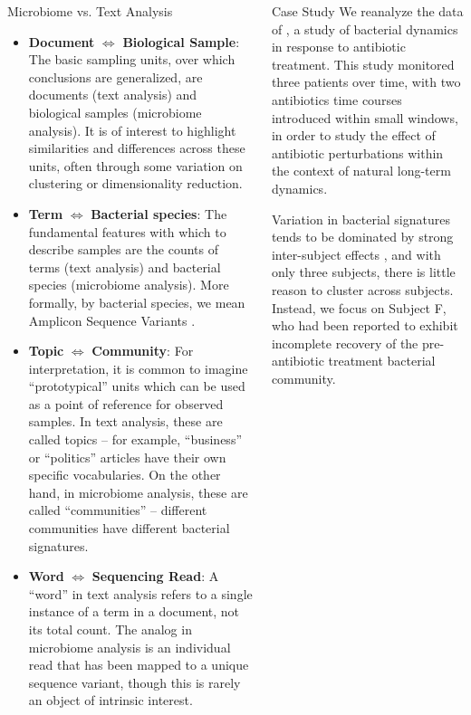 \documentclass[final, 8pt]{beamer}
\newlength{\onecolwid}
\begin{document}
\begin{frame}
\begin{columns}
\begin{column}{\onecolwid}
\begin{block}{Microbiome vs. Text Analysis}
\begin{itemize}
  \item \textbf{Document} $\iff$ \textbf{Biological Sample}: The basic sampling
    units, over which conclusions are generalized, are documents (text analysis)
    and biological samples (microbiome analysis). It is of interest to highlight
    similarities and differences across these units, often through some
    variation on clustering or dimensionality reduction.
  \item \textbf{Term} $\iff$ \textbf{Bacterial species}: The fundamental
    features with which to describe samples are the counts of terms (text
    analysis) and bacterial species (microbiome analysis). More formally, by
    bacterial species, we mean Amplicon Sequence Variants
    \citep{callahan2017exact}.
  \item \textbf{Topic} $\iff$ \textbf{Community}: For interpretation, it is
    common to imagine ``prototypical'' units which can be used as a point of
    reference for observed samples. In text analysis, these are called topics --
    for example, ``business'' or ``politics'' articles have their own specific
    vocabularies. On the other hand, in microbiome analysis, these are called
    ``communities'' -- different communities have different bacterial
    signatures.
  \item \textbf{Word} $\iff$ \textbf{Sequencing Read}: A ``word'' in text analysis refers
    to a single instance of a term in a document, not its total count. The
    analog in microbiome analysis is an individual read that has been mapped to
    a unique sequence variant, though this is rarely an object of intrinsic interest.
\end{itemize}
\end{block}

\end{column}

\begin{column}{\onecolwid}

\begin{block}{Case Study}
We reanalyze the data of \cite{dethlefsen2011incomplete}, a study of bacterial
dynamics in response to antibiotic treatment. This study monitored three
patients over time, with two antibiotics time courses introduced within small
windows, in order to study the effect of antibiotic perturbations within the
context of natural long-term dynamics.

Variation in bacterial signatures tends to be dominated by strong inter-subject
effects \citep{eckburg2005diversity}, and with only three subjects, there is
little reason to cluster across subjects. Instead, we focus on Subject F, who
had been reported to exhibit incomplete recovery of the pre-antibiotic treatment
bacterial community.


\end{block}
\end{column}
\end{columns}
\end{frame}
\end{document}
